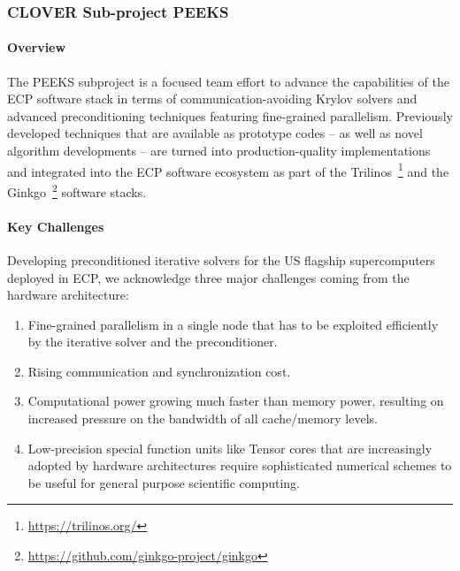 \subsubsection{ CLOVER Sub-project PEEKS} \label{subsubsect:peeks}
\paragraph{Overview} 
The PEEKS subproject is a focused team effort to advance the capabilities of the
ECP software stack in terms of communication-avoiding Krylov solvers and
advanced preconditioning techniques featuring fine-grained parallelism.
Previously developed techniques that are available as prototype codes -- as
well as novel algorithm developments -- are turned into production-quality 
implementations and integrated into the ECP software ecosystem 
as part of the Trilinos~\footnote{\url{https://trilinos.org/}} and the  
Ginkgo~\footnote{\url{https://github.com/ginkgo-project/ginkgo}} software 
stacks. 


\paragraph{Key  Challenges}
Developing preconditioned iterative solvers for the US flagship supercomputers 
deployed in ECP, we acknowledge three major challenges coming from the hardware 
architecture:
\begin{enumerate}
\item 
Fine-grained parallelism in a single node that has to be exploited efficiently 
by the iterative solver and the preconditioner.
\item
Rising communication and synchronization cost.
\item
Computational power growing much faster than memory power, resulting on 
increased pressure on the bandwidth of all cache/memory levels.
\item 
Low-precision special function units like Tensor cores that are increasingly 
adopted by hardware architectures require sophisticated numerical schemes to be 
useful for general purpose scientific computing.
\end{enumerate}

